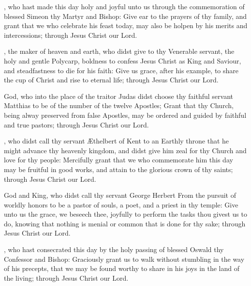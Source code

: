 , who hast made this day holy and joyful unto us through the commemoration of blessed Simeon thy Martyr and Bishop: Give ear to the prayers of thy family, and grant that we who celebrate his feast today, may also be holpen by his merits and intercessions; through Jesus Christ our Lord.

, the maker of heaven and earth, who didst give to thy Venerable servant, the holy and gentle Polycarp, boldness to confess Jesus Christ as King and Saviour, and steadfastness to die for his faith: Give us grace, after his example, to share the cup of Christ and rise to eternal life; through Jesus Christ our Lord.

 God, who into the place of the traitor Judas didst choose thy faithful servant Matthias to be of the number of the twelve Apostles; Grant that thy Church, being alway preserved from false Apostles, may be ordered and guided by faithful and true pastors; through Jesus Christ our Lord.

, who didst call thy servant Æthelbert of Kent to an Earthly throne that he might advance thy heavenly kingdom, and didst give him zeal for thy Church and love for thy people: Mercifully grant that we who commemorate him this day may be fruitful in good works, and attain to the glorious crown of thy saints; through Jesus Christ our Lord.

 God and King, who didst call thy servant George Herbert From the pursuit of worldly honors to be a pastor of souls, a poet, and a priest in thy temple: Give unto us the grace, we beseech thee, joyfully to perform the tasks thou givest us to do, knowing that nothing is menial or common that is done for thy sake; through Jesus Christ our Lord.

, who hast consecrated this day by the holy passing of blessed Oswald thy Confessor and Bishop: Graciously grant us to walk without stumbling in the way of his precepts, that we may be found worthy to share in his joys in the land of the living; through Jesus Christ our Lord.

